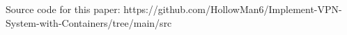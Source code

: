 \documentclass[article]{aaltoseries}
\begin{document}
Source code for this paper: https://github.com/HollowMan6/Implement-VPN-System-with-Containers/tree/main/src

















\end{document}
